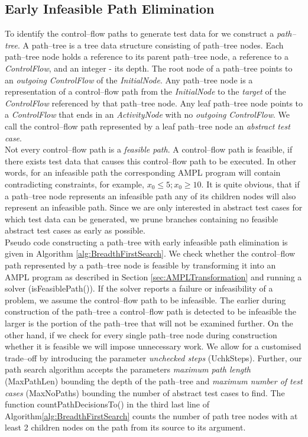 \documentclass[runningheads,a4paper]{llncs}%
\newcommand{\UMLType}[1]{\textsf{\textit{#1}}} %
\newcommand{\UMLReference}[1]{\textsf{\textit{#1}}} %
\begin{document}
\subsection{Early Infeasible Path Elimination}%
\label{sec:InfeasiblePathElimination}%
To identify the control--flow paths to generate test data for we construct a \emph{path--tree}. A path--tree is a tree data structure consisting of path--tree nodes. Each path--tree node holds a reference to its parent path--tree node, a reference to a \UMLType{ControlFlow}, and an integer - its depth. The root node of a path--tree points to an \UMLReference{outgoing} \UMLType{ControlFlow} of the \UMLType{InitialNode}. Any path--tree node is a representation of a control--flow path from the \UMLType{InitialNode} to the \UMLReference{target} of the \UMLType{ControlFlow} referenced by that path--tree node. Any leaf path--tree node points to a \UMLType{ControlFlow} that ends in an \UMLType{ActivityNode} with no \UMLReference{outgoing} \UMLType{ControlFlow}. We call the control--flow path represented by a leaf path--tree node an \emph{abstract test case}.\\
Not every control--flow path is a \emph{feasible path}. A control--flow path is feasible, if there exists test data that causes this control--flow path to be executed. In other words, for an infeasible path the corresponding AMPL program will contain contradicting constraints, for example, $x_0\leq5; x_0\geq10$. It is quite obvious, that if a path--tree node represents an infeasible path any of its children nodes will also represent an infeasible path. Since we are only interested in abstract test cases for which test data can be generated, we prune branches containing no feasible abstract test cases as early as possible.\\
Pseudo code constructing a path--tree with early infeasible path elimination is given in Algorithm \ref{alg:BreadthFirstSearch}. We check whether the control--flow path represented by a path--tree node is feasible by transforming it into an AMPL program as described in Section \ref{sec:AMPLTransformation} and running a solver (isFeasiblePath()). If the solver reports a failure or infeasibility of a problem, we assume the control--flow path to be infeasible. The earlier during construction of the path--tree a control--flow path is detected to be infeasible the larger is the portion of the path--tree that will not be examined further. On the other hand, if we check for every single path--tree node during construction whether it is feasible we will impose unnecessary work. We allow for a customised trade--off by introducing the parameter \emph{unchecked steps} (UchkSteps). Further, our path search algorithm accepts the parameters \emph{maximum path length} (MaxPathLen) bounding the depth of the path--tree and \emph{maximum number of test cases} (MaxNoPaths) bounding the number of abstract test cases to find. The function countPathDecisionsTo() in the third last line of Algorithm\ref{alg:BreadthFirstSearch} counts the number of path tree nodes with at least 2 children nodes on the path from its source to its argument. %
\end{document}
